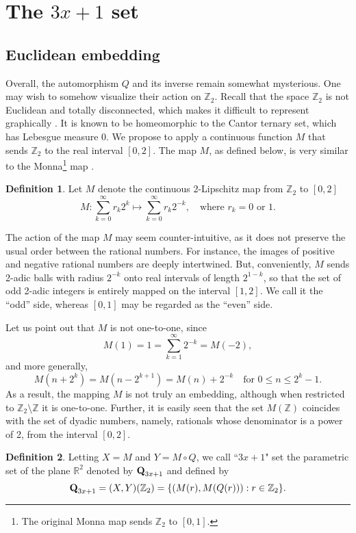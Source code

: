 \documentclass[12pt]{article}
\theoremstyle{definition}
\newtheorem{definition}{Definition}
\newcommand{\Qset}{\normalfont \textbf{Q}_{3x+1}}
\begin{document}
{\section{The $3x+1$ set}

\subsection{Euclidean embedding}
\label{sub:embed}
Overall, the automorphism $Q$ and its inverse remain somewhat mysterious. One may wish to somehow visualize their action on $\mathbb Z_2$. Recall that the space $\mathbb Z_2$ is not Euclidean and totally disconnected, which makes it difficult to represent graphically \cite{Chi96, Cuo91}. It is known to be homeomorphic to the Cantor ternary set, which has Lebesgue measure 0. We propose to apply a continuous function $M$ that sends $\mathbb Z_2$ to the real interval $[0, 2]$. The map $M$, as defined below, is very similar to the Monna\footnote{The original Monna map sends $\mathbb Z_2$ to $[0, 1]$.}  map \cite{Mon52}. 

\begin{definition} \label{def:M}
Let $M$ denote the continuous 2-Lipschitz map from $\mathbb Z_2$ to $[0, 2]$
$$ M: \sum_{k=0}^{\infty} r_{k} 2^{k} \longmapsto \sum_{k=0}^{\infty} r_k 2^{-k}, \quad \text{where $r_k=0$ or 1}.$$
\end{definition}

The action of the map $M$ may seem counter-intuitive, as it does not preserve the usual order between the rational numbers. For instance, the images of positive and negative rational numbers are deeply intertwined. But, conveniently, $M$ sends 2-adic balls with radius $2^{-k}$ onto real intervals of length $2^{1-k}$, so that the set of odd 2-adic integers is entirely mapped on the interval $[1, 2]$. We call it the ``odd'' side, whereas $[0, 1]$ may be regarded as the ``even'' side.

Let us point out that $M$ is not one-to-one, since
$$ M(1) = 1 = \sum_{k=1}^{\infty} 2^{-k} = M(-2),$$
and more generally,
$$ M\left( n+2^k\right)  = M\left( n-2^{k+1}\right)  = M(n) + 2^{-k} \quad \text{for } 0 \leq n \leq 2^{k}-1.$$
As a result, the mapping $M$ is not truly an embedding, although when restricted to $\mathbb Z_2 \setminus \mathbb Z$ it is one-to-one. Further, it is easily seen that the set $M(\mathbb Z)$ coincides with the set of dyadic numbers, namely, rationals whose denominator is a power of 2, from the interval $[0,2]$.

\begin{definition} \label{def:Qset}
Letting $X=M$ and $Y=M \circ Q$, we call ``$3x+1$" set the parametric set of the plane $\mathbb R^2$ denoted by $\Qset$ and defined by 
$$ \Qset = (X,Y)(\mathbb Z_2) = \lbrace \left( M(r), M(Q(r)) \right) : r \in \mathbb Z_2 \rbrace.$$
\end{definition}

}
\end{document}
